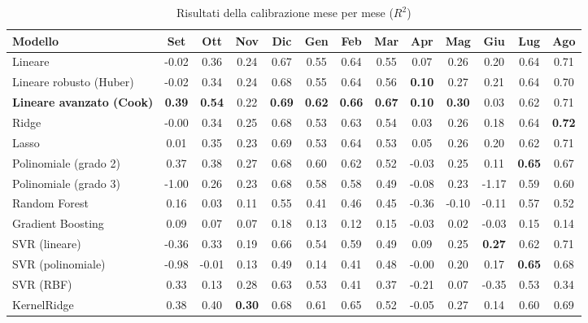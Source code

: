 \begin{table}[H]
    \tiny
    \centering
    \setlength{\tabcolsep}{4pt}
    \def\arraystretch{1.5}
    \begin{tabular}{|l|c|c|c|c|c|c|c|c|c|c|c|c|}
    \hline
        \textbf{Modello} & \textbf{Set} & \textbf{Ott} & \textbf{Nov} & \textbf{Dic} & \textbf{Gen} & \textbf{Feb} & \textbf{Mar} & \textbf{Apr} & \textbf{Mag} & \textbf{Giu} & \textbf{Lug} & \textbf{Ago} \\ \hline
        Lineare & -0.02 & 0.36 & 0.24 & 0.67 & 0.55 & 0.64 & 0.55 & 0.07 & 0.26 & 0.20 & 0.64 & 0.71 \\ \hline
        Lineare robusto (Huber) & -0.02 & 0.34 & 0.24 & 0.68 & 0.55 & 0.64 & 0.56 & \textbf{0.10} & 0.27 & 0.21 & 0.64 & 0.70 \\ \hline
        \textbf{Lineare avanzato (Cook)} & \textbf{0.39} & \textbf{0.54} & 0.22 & \textbf{0.69} & \textbf{0.62} & \textbf{0.66} & \textbf{0.67} & \textbf{0.10} & \textbf{0.30} & 0.03 & 0.62 & 0.71 \\ \hline
        Ridge & -0.00 & 0.34 & 0.25 & 0.68 & 0.53 & 0.63 & 0.54 & 0.03 & 0.26 & 0.18 & 0.64 & \textbf{0.72} \\ \hline
        Lasso & 0.01 & 0.35 & 0.23 & 0.69 & 0.53 & 0.64 & 0.53 & 0.05 & 0.26 & 0.20 & 0.62 & 0.71 \\ \hline
        Polinomiale (grado 2) & 0.37 & 0.38 & 0.27 & 0.68 & 0.60 & 0.62 & 0.52 & -0.03 & 0.25 & 0.11 & \textbf{0.65} & 0.67 \\ \hline
        Polinomiale (grado 3) & -1.00 & 0.26 & 0.23 & 0.68 & 0.58 & 0.58 & 0.49 & -0.08 & 0.23 & -1.17 & 0.59 & 0.60 \\ \hline
        Random Forest & 0.16 & 0.03 & 0.11 & 0.55 & 0.41 & 0.46 & 0.45 & -0.36 & -0.10 & -0.11 & 0.57 & 0.52 \\ \hline
        Gradient Boosting & 0.09 & 0.07 & 0.07 & 0.18 & 0.13 & 0.12 & 0.15 & -0.03 & 0.02 & -0.03 & 0.15 & 0.14 \\ \hline
        SVR (lineare) & -0.36 & 0.33 & 0.19 & 0.66 & 0.54 & 0.59 & 0.49 & 0.09 & 0.25 & \textbf{0.27} & 0.62 & 0.71 \\ \hline
        SVR (polinomiale) & -0.98 & -0.01 & 0.13 & 0.49 & 0.14 & 0.41 & 0.48 & -0.00 & 0.20 & 0.17 & \textbf{0.65} & 0.68 \\ \hline
        SVR (RBF) & 0.33 & 0.13 & 0.28 & 0.63 & 0.53 & 0.41 & 0.37 & -0.21 & 0.07 & -0.35 & 0.53 & 0.34 \\ \hline
        KernelRidge & 0.38 & 0.40 & \textbf{0.30} & 0.68 & 0.61 & 0.65 & 0.52 & -0.05 & 0.27 & 0.14 & 0.60 & 0.69 \\ \hline
    \end{tabular}
    \caption{Risultati della calibrazione  mese per mese ($R^2$)}
    \label{fig:risultati-pm10-mese}
\end{table}

